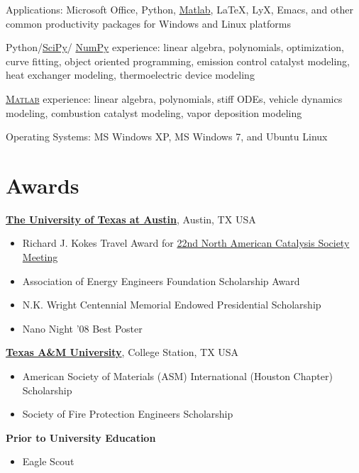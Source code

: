 \documentclass[line,margin]{res}
\begin{document}
\begin{resume}
Applications: Microsoft Office, Python,
\href{http://www.mathworks.com/products/matlab/}{Matlab}, \LaTeX, LyX,
Emacs, and other common productivity packages for Windows and Linux
platforms

Python/\href{http://www.scipy.org/}{SciPy}/%
\href{http://numpy.scipy.org/}{NumPy}
experience: linear algebra, polynomials, optimization, curve fitting,
object oriented programming, emission control catalyst modeling, heat
exchanger modeling, thermoelectric device modeling

\href{http://www.mathworks.com/products/matlab/}{\textsc{Matlab}}
experience: linear algebra, polynomials, stiff ODEs, vehicle dynamics
modeling, combustion catalyst modeling, vapor deposition modeling

Operating Systems: MS Windows XP, MS Windows 7, and Ubuntu Linux

\section{Awards}
% 
\href{http://www.utexas.edu/}{\textbf{The University of Texas at Austin}}, Austin, TX USA
\begin{itemize}
\item Richard J. Kokes Travel Award for
  \href{http://www.22nam.org/}{22nd North American Catalysis Society
    Meeting}
\item Association of Energy Engineers Foundation Scholarship Award
\item N.K. Wright Centennial Memorial Endowed Presidential Scholarship
\item Nano Night '08 Best Poster
\end{itemize}

\href{http://www.tamu.edu/}{\textbf{Texas A\&M University}}, College Station, TX USA
\begin{itemize}
\item American Society of Materials (ASM) International (Houston Chapter) Scholarship
\item Society of Fire Protection Engineers Scholarship
\end{itemize}

\textbf{Prior to University Education}
\begin{itemize}
\item Eagle Scout
\end{itemize}

\end{resume}
\end{document}

